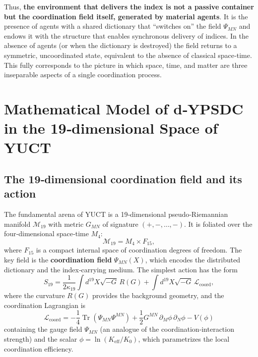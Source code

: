 \documentclass[12pt,a4paper]{article}
\DeclareMathOperator{\Tr}{Tr}
\begin{document}
	Thus, \textbf{the environment that delivers the index is not a passive container but the coordination field itself, generated by material agents}. It is the presence of agents with a shared dictionary that “switches on” the field \(\Psi_{MN}\) and endows it with the structure that enables synchronous delivery of indices. In the absence of agents (or when the dictionary is destroyed) the field returns to a symmetric, uncoordinated state, equivalent to the absence of classical space‑time. This fully corresponds to the picture in which space, time, and matter are three inseparable aspects of a single coordination process.
	
	\section{Mathematical Model of d‑YPSDC in the 19‑dimensional Space of YUCT}
	\label{sec:math-model}
	
	\subsection{The 19‑dimensional coordination field and its action}
	
	The fundamental arena of YUCT is a 19‑dimensional pseudo‑Riemannian manifold \(\mathcal{M}_{19}\) with metric \(G_{MN}\) of signature \((+,-,\dots,-)\). It is foliated over the four‑dimensional space‑time \(M_4\):
	\begin{equation}
		\mathcal{M}_{19} = M_4 \times F_{15},
	\end{equation}
	where \(F_{15}\) is a compact internal space of coordination degrees of freedom. The key field is the \textbf{coordination field} \(\Psi_{MN}(X)\), which encodes the distributed dictionary and the index‑carrying medium. The simplest action has the form
	\begin{equation}
		S_{19} = \frac{1}{2\kappa_{19}} \int d^{19}X \sqrt{-G}\, R(G) + \int d^{19}X \sqrt{-G}\, \mathcal{L}_{\mathrm{coord}},
		\label{eq:S19}
	\end{equation}
	where the curvature \(R(G)\) provides the background geometry, and the coordination Lagrangian is
	\begin{equation}
		\mathcal{L}_{\mathrm{coord}} = -\frac{1}{4} \Tr(\Psi_{MN}\Psi^{MN}) + \frac{1}{2} G^{MN}\,\partial_M \phi\,\partial_N \phi - V(\phi)
		\label{eq:Lcoord}
	\end{equation}
	containing the gauge field \(\Psi_{MN}\) (an analogue of the coordination‑interaction strength) and the scalar \(\phi = \ln(K_{\mathrm{eff}}/K_0)\), which parametrizes the local coordination efficiency.
	
\end{document}
